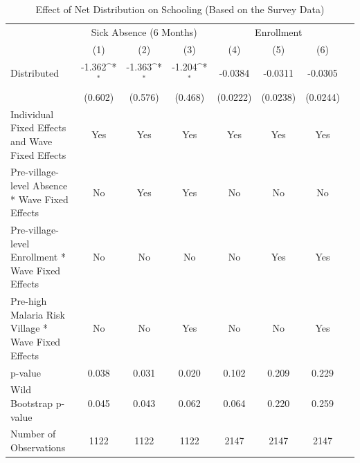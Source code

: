 \documentclass[fleqn,11pt]{article}
\newcommand{\sym}[1]{\rlap{$#1$}}
\def\sym#1{\ifmmode^{#1}\else\(^{#1}\)\fi
}
\begin{document}
\begin{table}[h]
\caption{Effect of Net Distribution on Schooling (Based on the Survey Data)}
\label{t:absence3rd_questionnaire_child}\centering
\begin{adjustbox}{max width=\textwidth}
\begin{threeparttable}
\begin{tabular}{l*{7}{c}}
\hline\hline
          &\multicolumn{3}{c}{Sick Absence (6 Months)}&\multicolumn{3}{c}{Enrollment}\\   \cmidrule(lr){2-4} \cmidrule(lr){5-7}
                          &\multicolumn{1}{c}{(1)}&\multicolumn{1}{c}{(2)}&\multicolumn{1}{c}{(3)}&\multicolumn{1}{c}{(4)}&\multicolumn{1}{c}{(5)}&\multicolumn{1}{c}{(6)}\\

\hline
Distributed         &         -1.362\sym{*}  &      -1.363\sym{*}  &      -1.204\sym{*}      &          -0.0384         &     -0.0311         &     -0.0305 \\
                   &     (0.602)         &     (0.576)         &     (0.468)                 &     (0.0222)         &    (0.0238)         &    (0.0244)         \\

Individual Fixed Effects and Wave Fixed Effects &         Yes         &         Yes         &         Yes         &         Yes         &         Yes         &         Yes         \\

Pre-village-level Absence * Wave Fixed Effects&          No         &         Yes         &         Yes         &          No         &         No         &         No         \\

Pre-village-level Enrollment * Wave Fixed Effects&       No         &          No     & No&     No         &         Yes         &         Yes         \\

Pre-high Malaria Risk Village * Wave Fixed Effects&          No         &          No         &         Yes         &          No         &          No         &         Yes         \\
\hline
p-value             &       0.038         &       0.031         &       0.020         &       0.102         &       0.209         &       0.229         \\
Wild Bootstrap p-value &       0.045         &       0.043         &       0.062         &       0.064         &       0.220         &       0.259         \\
Number of Observations        &        1122         &        1122         &        1122         &      2147         &        2147         &        2147         \\
                    

\end{tabular}
\end{threeparttable}
\end{adjustbox}
\end{table}
\end{document}
